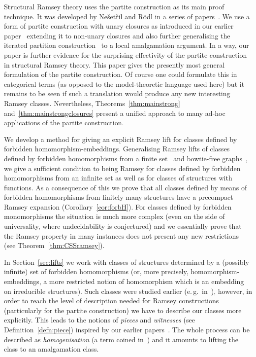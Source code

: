 \documentclass{elsarticle}
\newcommand{\eg}{e.\,g.}
\theoremstyle{plain}
\theoremstyle{definition}
\theoremstyle{remark}
\begin{document}
Structural Ramsey theory uses  the partite construction as its main proof technique. It was developed by Ne\v set\v ril and R\"odl in a series of papers~\cite{Nevsetvril1976,Nevsetvril1977,Nevsetvril1979,Nevsetvril1981,Nevsetvril1982,Nevsetvril1983,Nevsetvril1984,Nevsetvril1987,Nevsetvril1989,Nevsetvril1990,Nevsetvril2007}. We use a form of partite construction with unary closures as introduced in our earlier paper~\cite{Hubivcka2014} extending it to non-unary closures and also further generalising the iterated partition construction~\cite{Nevsetvril2007} to a local amalgamation argument. In a way, our paper is further evidence for the surprising effectivity of the partite construction in structural Ramsey theory.
This paper gives the presently most general formulation of the partite construction. Of course one could formulate this in categorical terms (as opposed to the model-theoretic language used here) but it remains to be seen if such a translation would produce any new interesting Ramsey classes. Nevertheless, Theorems~\ref{thm:mainstrong} and~\ref{thm:mainstrongclosures} present a unified approach to many ad-hoc applications of the partite construction.

We develop a
method for giving an explicit Ramsey lift for classes defined by forbidden
homomorphism-embeddings.  Generalising Ramsey lifts of classes defined by forbidden homomorphisms from a finite set~\cite{Nevsetvril}
and bowtie-free graphs~\cite{Hubivcka2014}, we give a sufficient condition to being Ramsey
for classes defined by forbidden homomorphisms from an infinite set as well as for classes of structures with functions. As a consequence of this we prove that all classes defined by means of forbidden homomorphisms from finitely many structures have a precompact Ramsey expansion (Corollary~\ref{cor:forbH}).
For classes defined by forbidden monomorphisms the situation is much more complex (even on the side of universality, where undecidability is conjectured) and we essentially prove that the Ramsey property in many instances does not present any new restrictions (see Theorem~\ref{thm:CSSramsey}).

In Section~\ref{sec:lifts} we work with classes of structures determined by a (possibly infinite) set of forbidden homomorphisms (or, more precisely, homomorphism-embeddings, a more restricted notion of homomorphism which is an
embedding on irreducible structures).
Such classes were studied earlier (\eg{}\ in~\cite{Komjath1988, Komjath1999, Cherlin1999}), however, in order to reach the level of description needed for Ramsey constructions (particularly for the partite construction) we have to describe our classes more explicitly. This leads to the notions of \emph{pieces} and \emph{witnesses}  (see Definition~\ref{defn:piece}) inspired by our earlier papers~\cite{Hubicka2013,Hubicka2009}.
The whole process can be described as \emph{homogenisation} (a term coined in~\cite{Covington1990}) and it amounts to lifting the class to an amalgamation class.
\end{document}
